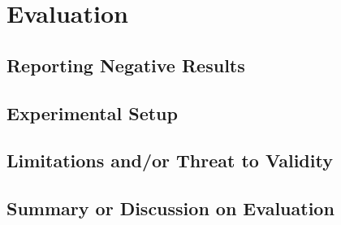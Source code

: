 
\chapter{Evaluation} %



\ifpdf
    \graphicspath{{5_evaluation/figures/PNG/}{5_evaluation/figures/PDF/}{5_evaluation/figures/}}
\else
    \graphicspath{{5_evaluation/figures/EPS/}{5_evaluation/figures/}}
\fi


% 

\section{Reporting Negative Results}

\section{Experimental Setup}

\section{Limitations and/or Threat to Validity}

\section{Summary or Discussion on Evaluation}



